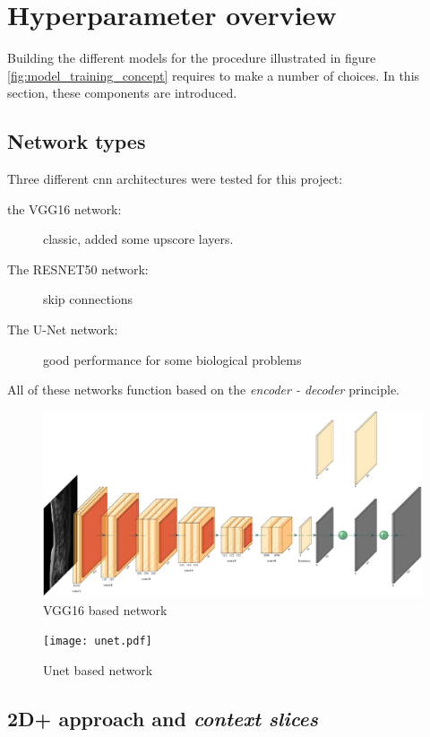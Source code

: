 \section{Hyperparameter overview}

Building the different models for the procedure illustrated in figure \ref{fig:model_training_concept} requires to make a number of choices.
In this section, these components are introduced.

\subsection{Network types\label{sec:network_types}}

Three different \acrlong{cnn} architectures were tested for this project:
\begin{description}
    \item[the VGG16 network: ] classic, added some upscore layers.
    \item[The RESNET50 network:] skip connections
    \item[The U-Net network: ] good performance for some biological problems
\end{description}

All of these networks function based on the \textit{encoder - decoder} principle.

\begin{figure}
    \centering
    \includegraphics[width=.95\textwidth]{vgg16_upscore.pdf}
    \caption{VGG16 based network}
\end{figure}

\begin{figure}
    \centering
    \texttt{[image: unet.pdf]}
    \caption{Unet based network}
\end{figure}

\subsection{2D+ approach and \textit{context slices}\label{section:twoDplus}}

